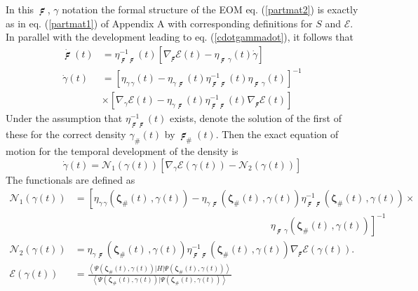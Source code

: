 \documentclass[aps,preprint]{revtex4}%
\begin{document}
In this $\mathbf{{\digamma}}$, $\gamma$ notation the formal structure of the
EOM eq. (\ref{partmat2}) is exactly as in eq. (\ref{partmat1}) of Appendix A
with corresponding definitions for $S$ and $\mathcal{E}$. In parallel with the
development leading to eq. (\ref{cdotgammadot}), it follows that
\begin{align}
\dot{\mathbf{\digamma}}(t)  &  =\eta_{\mathbf{\digamma\,\digamma}}%
^{-1}(t)\left[  \nabla_{\mathbf{\digamma}}\mathcal{E}(t)-\eta
_{\mathbf{\digamma}\,\gamma}(t)\dot{\gamma}\right] \nonumber\\
\dot{\gamma}(t)  &  =\left[  \eta_{\gamma\,\gamma}(t)-\eta_{\gamma
\,\mathbf{\digamma}}(t)\eta_{\mathbf{\digamma}\,\mathbf{\digamma}}^{-1}%
(t)\eta_{\mathbf{\digamma}\,\gamma}(t)\right]  ^{-1}\nonumber\\
&  \times\left[  \nabla_{\gamma}\mathcal{E}(t)-\eta_{\gamma\,\mathbf{\digamma
}}(t)\eta_{\mathbf{\digamma}\,\mathbf{\digamma}}^{-1}(t)\nabla
_{\mathbf{\digamma}}\mathcal{E}(t)\right]
\end{align}
Under the assumption that $\eta_{\mathbf{\digamma\digamma}}^{-1}(t)$ exists,
denote the solution of the first of these for the correct density $\gamma
_{\#}(t)$ by $\mathbf{\digamma}_{\#}(t)$. Then the exact equation of motion
for the temporal development of the density is
\begin{equation}
\dot{\gamma}(t)=\mathcal{N}_{1}(\gamma(t))\left[  \nabla_{\gamma}%
\mathcal{E}(\gamma(t))-\mathcal{N}_{2}(\gamma(t))\right]
\end{equation}
The functionals are defined as
\begin{align}
\mathcal{N}_{1}(\gamma(t))  &  =\left[  \eta_{\gamma\,\gamma}(\mathbf{\zeta
}_{\#}(t)\,,\gamma(t))-\eta_{\gamma\,\mathbf{\digamma}}(\mathbf{\zeta}%
_{\#}(t)\,,\gamma(t))\eta_{\mathbf{\digamma}\,\mathbf{\digamma}}%
^{-1}(\mathbf{\zeta}_{\#}(t)\,,\gamma(t))\right.  \times\nonumber\\
&  \qquad\qquad\qquad\qquad\qquad\qquad\qquad\qquad\qquad\qquad\left.
\eta_{\mathbf{\digamma}\,\gamma}(\mathbf{\zeta}_{\#}(t)\,,\gamma(t))\right]
^{-1}\\
\mathcal{N}_{2}\left(  \gamma(t)\right)   &  =\eta_{\gamma\,\mathbf{\digamma}%
}(\mathbf{\zeta}_{\#}(t)\,,\gamma(t))\eta_{\mathbf{\digamma}\,\mathbf{\digamma
}}^{-1}(\mathbf{\zeta}_{\#}(t)\,,\gamma(t))\nabla_{\mathbf{\digamma}%
}\mathcal{E}(\gamma(t)).\quad\\
\mathcal{E}(\gamma(t))  &  =\frac{\left\langle \Psi(\mathbf{\zeta}%
_{\#}(t),\gamma(t))|H|\Psi(\mathbf{\zeta}_{\#}(t),\gamma(t))\right\rangle
}{\left\langle \Psi(\mathbf{\zeta}_{\#}(t),\gamma(t))|\Psi(\mathbf{\zeta}%
_{\#}(t),\gamma(t))\right\rangle }%
\end{align}
\end{document}
